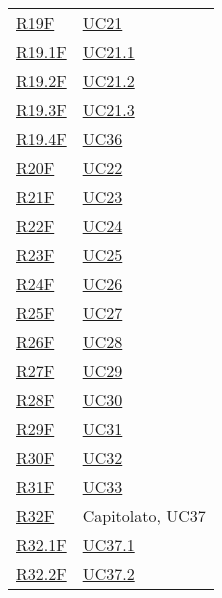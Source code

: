 \begin{center}
\begin{longtable}[!h]{p{50px} p{50px}}
        \hyperref[tab:RequisitiFunzionali]{R19F}   & \hyperref[sec:UC21]{UC21}                      \\
        \hyperref[tab:RequisitiFunzionali]{R19.1F} & \hyperref[sec:UC21.1]{UC21.1}                  \\
        \hyperref[tab:RequisitiFunzionali]{R19.2F} & \hyperref[sec:UC21.2]{UC21.2}                  \\
        \hyperref[tab:RequisitiFunzionali]{R19.3F} & \hyperref[sec:UC21.3]{UC21.3}                  \\
        \hyperref[tab:RequisitiFunzionali]{R19.4F} & \hyperref[sec:UC36]{UC36}                      \\
        \hyperref[tab:RequisitiFunzionali]{R20F}   & \hyperref[sec:UC22]{UC22}                      \\
        \hyperref[tab:RequisitiFunzionali]{R21F}   & \hyperref[sec:UC23]{UC23}                      \\
        \hyperref[tab:RequisitiFunzionali]{R22F}   & \hyperref[sec:UC24]{UC24}                      \\
        \hyperref[tab:RequisitiFunzionali]{R23F}   & \hyperref[sec:UC25]{UC25}                      \\
        \hyperref[tab:RequisitiFunzionali]{R24F}   & \hyperref[sec:UC26]{UC26}                      \\
        \hyperref[tab:RequisitiFunzionali]{R25F}   & \hyperref[sec:UC27]{UC27}                      \\
        \hyperref[tab:RequisitiFunzionali]{R26F}   & \hyperref[sec:UC28]{UC28}                      \\
        \hyperref[tab:RequisitiFunzionali]{R27F}   & \hyperref[sec:UC29]{UC29}                      \\
        \hyperref[tab:RequisitiFunzionali]{R28F}   & \hyperref[sec:UC30]{UC30}                      \\
        \hyperref[tab:RequisitiFunzionali]{R29F}   & \hyperref[sec:UC31]{UC31}                      \\
        \hyperref[tab:RequisitiFunzionali]{R30F}   & \hyperref[sec:UC32]{UC32}                      \\
        \hyperref[tab:RequisitiFunzionali]{R31F}   & \hyperref[sec:UC33]{UC33}                      \\
        \hyperref[tab:RequisitiFunzionali]{R32F}   & Capitolato, UC37                                     \\
        \hyperref[tab:RequisitiFunzionali]{R32.1F} & \hyperref[sec:UC37.1]{UC37.1}                  \\
        \hyperref[tab:RequisitiFunzionali]{R32.2F} & \hyperref[sec:UC37.2]{UC37.2}                  \\




\end{longtable}
\end{center}
